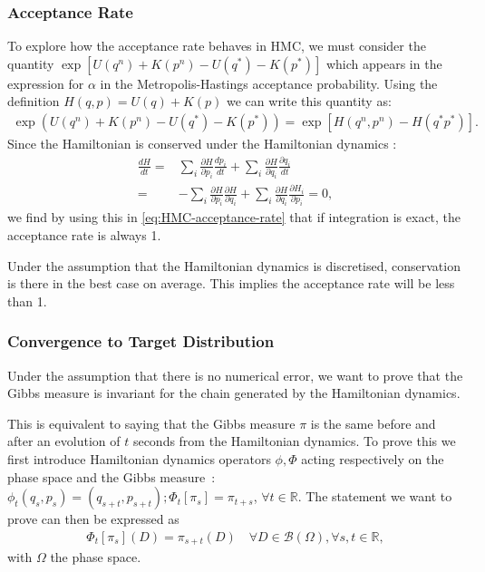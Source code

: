 \documentclass[a4paper, 12pt,oneside]{article}
\begin{document}
			\subsubsection{Acceptance Rate}\label{sec:acceptance-rate}
			To explore how the acceptance rate behaves in HMC, we must consider the quantity \newline $\exp \left[U\left(q^n\right)+K\left(p^n\right)-U\left(q^*\right)-K\left(p^*\right)\right]$ which appears in the expression for $\alpha$ in the Metropolis-Hastings acceptance probability. Using the definition $H(q, p)=U(q)+K(p)$ we can write this quantity as:
			\begin{gather}
				\exp \left(U\left(q^n\right)+K\left(p^n\right)-U\left(q^*\right)-K\left(p^*\right)\right) = \exp \left[H\left(q^n, p^n\right)-H\left(q^* p^*\right)\right].
				\label{eq:HMC-acceptance-rate} 
			\end{gather}
			Since the Hamiltonian is conserved under the Hamiltonian dynamics :
			\begin{align}
			\frac{d H}{d t}=&\sum_i \frac{\partial H}{\partial p_i} \frac{d p_i}{d t}+\sum_i \frac{\partial H}{\partial q_i} \frac{\partial q_i}{d t} \\
			=&-\sum_i \frac{\partial H}{\partial p_i} \frac{\partial H}{\partial q_i}+\sum_i \frac{\partial H}{\partial q_i} \frac{\partial H_i}{\partial p_i} = 0,
			\end{align}
			we find by using this in \ref{eq:HMC-acceptance-rate} that if integration is exact, the acceptance rate is always 1.

			Under the assumption that the Hamiltonian dynamics is discretised, conservation is there in the best case on average. This implies the acceptance rate will be less than 1. 
			\subsubsection{Convergence to Target Distribution}
			Under the assumption that there is no numerical error, we want to prove that the Gibbs measure is invariant for the chain generated by the Hamiltonian dynamics.
	
			This is equivalent to saying that the Gibbs measure $\pi$ is the same before and after an evolution of $t$ seconds from the Hamiltonian dynamics. 
			To prove this we first introduce Hamiltonian dynamics operators $\phi,\Phi$ acting respectively on the phase space and the Gibbs measure~: $\phi_t(q_s,p_s)=(q_{s+t},p_{s+t});\Phi_t[\pi_s]=\pi_{t+s}$, $\forall t\in\mathbb{R}$.
			The statement we want to prove can then be expressed as 
			\begin{gather}
				\Phi_t[\pi_s](D)=\pi_{s+t}(D)\quad \forall D\in\mathcal{B}(\Omega),\forall s,t\in\mathbb{R},
			\end{gather}
			with $\Omega$ the phase space.
	
\end{document}
